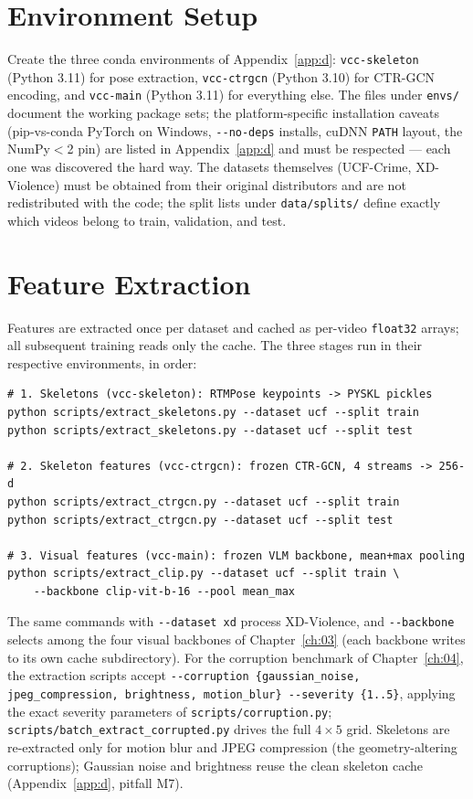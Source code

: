 \section{Environment Setup}
\label{sec:appe-envs}

Create the three conda environments of Appendix~\ref{app:d}:
\texttt{vcc-skeleton} (Python 3.11) for pose extraction, \texttt{vcc-ctrgcn}
(Python 3.10) for CTR-GCN encoding, and \texttt{vcc-main} (Python 3.11) for
everything else. The files under \texttt{envs/} document the working package
sets; the platform-specific installation caveats (pip-vs-conda PyTorch on
Windows, \texttt{-{}-no-deps} installs, cuDNN \texttt{PATH} layout, the
NumPy$<$2 pin) are listed in Appendix~\ref{app:d} and must be respected ---
each one was discovered the hard way. The datasets themselves (UCF-Crime,
XD-Violence) must be obtained from their original distributors and are not
redistributed with the code; the split lists under \texttt{data/splits/}
define exactly which videos belong to train, validation, and test.

\section{Feature Extraction}
\label{sec:appe-extract}

Features are extracted once per dataset and cached as per-video
\texttt{float32} arrays; all subsequent training reads only the cache. The
three stages run in their respective environments, in order:

\begin{verbatim}
# 1. Skeletons (vcc-skeleton): RTMPose keypoints -> PYSKL pickles
python scripts/extract_skeletons.py --dataset ucf --split train
python scripts/extract_skeletons.py --dataset ucf --split test

# 2. Skeleton features (vcc-ctrgcn): frozen CTR-GCN, 4 streams -> 256-d
python scripts/extract_ctrgcn.py --dataset ucf --split train
python scripts/extract_ctrgcn.py --dataset ucf --split test

# 3. Visual features (vcc-main): frozen VLM backbone, mean+max pooling
python scripts/extract_clip.py --dataset ucf --split train \
    --backbone clip-vit-b-16 --pool mean_max
\end{verbatim}

The same commands with \texttt{-{}-dataset xd} process XD-Violence, and
\texttt{-{}-backbone} selects among the four visual backbones of
Chapter~\ref{ch:03} (each backbone writes to its own cache subdirectory). For
the corruption benchmark of Chapter~\ref{ch:04}, the extraction scripts accept
\texttt{-{}-corruption \{gaussian\_noise, jpeg\_compression, brightness,
motion\_blur\} -{}-severity \{1..5\}}, applying the exact severity parameters
of \texttt{scripts/corruption.py}; \texttt{scripts/batch\_extract\_corrupted.py}
drives the full $4\times5$ grid. Skeletons are re-extracted only for motion
blur and JPEG compression (the geometry-altering corruptions); Gaussian noise
and brightness reuse the clean skeleton cache (Appendix~\ref{app:d}, pitfall
M7).

